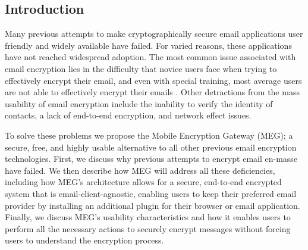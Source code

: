 \documentclass[10pt]{article}
\begin{document}
\begin{multicols}{2}
\section{Introduction}
\par Many previous attempts to make cryptographically secure email applications user friendly and widely available have failed. For varied reasons, these applications have not reached widespread adoption. The most common issue associated with email encryption lies in the difficulty that novice users face when trying to effectively encrypt their email, and even with special training, most average users are not able to effectively encrypt their emails \cite{whitten1999johnny}. Other detractions from the mass usability of email encryption include the inability to verify the identity of contacts, a lack of end-to-end encryption, and network effect issues.
\par To solve these problems we propose the Mobile Encryption Gateway (MEG); a secure, free, and highly usable alternative to all other previous email encryption technologies. First, we discuss why previous attempts to encrypt email en-masse have failed. We then describe how MEG will address all these deficiencies, including how MEG's architecture allows for a secure, end-to-end encrypted system that is email-client-agnostic, enabling users to keep their preferred email provider by installing an additional plugin for their browser or email application. Finally, we discuss MEG's usability characteristics and how it enables users to perform all the necessary actions to securely encrypt messages without forcing users to understand the encryption process.
\vfill

\end{multicols}
\end{document}
